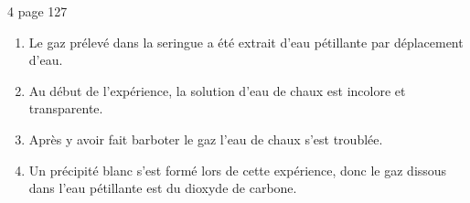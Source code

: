 \begin{myact}{4 page 127}
	\begin{enumerate}
		\item Le gaz prélevé dans la seringue a été extrait d'eau pétillante par déplacement d'eau.\pause
		\item Au début de l'expérience, la solution d'eau de chaux est incolore et transparente.\pause
		\item Après y avoir fait barboter le gaz l'eau de chaux s'est troublée.\pause
		\item Un précipité blanc s'est formé lors de cette expérience, donc le gaz dissous dans l'eau pétillante est du dioxyde de carbone.
	\end{enumerate}
\end{myact}